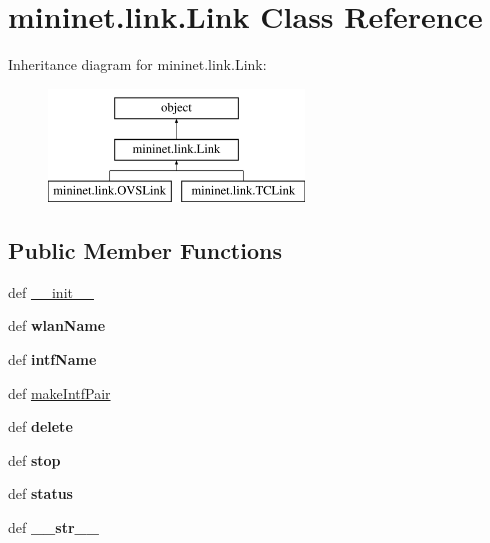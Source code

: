 \hypertarget{classmininet_1_1link_1_1Link}{\section{mininet.\-link.\-Link Class Reference}
\label{classmininet_1_1link_1_1Link}
}
Inheritance diagram for mininet.\-link.\-Link\-:\begin{figure}[H]
\begin{center}
\leavevmode
\includegraphics[height=3.000000cm]{classmininet_1_1link_1_1Link}
\end{center}
\end{figure}
\subsection*{Public Member Functions}
\begin{DoxyCompactItemize}
\item 
def \hyperlink{classmininet_1_1link_1_1Link_a05be53888b4da5ffc058c778659296f5}{\-\_\-\-\_\-init\-\_\-\-\_\-}
\item 
\hypertarget{classmininet_1_1link_1_1Link_a7cff25664aad51edfbfa64edfcd832dc}{def {\bfseries wlan\-Name}}\label{classmininet_1_1link_1_1Link_a7cff25664aad51edfbfa64edfcd832dc}

\item 
\hypertarget{classmininet_1_1link_1_1Link_aa3ea9cb1099157f8b8be624a7f2a7bdb}{def {\bfseries intf\-Name}}\label{classmininet_1_1link_1_1Link_aa3ea9cb1099157f8b8be624a7f2a7bdb}

\item 
def \hyperlink{classmininet_1_1link_1_1Link_ade37d7cffeff73830bec0129ac754622}{make\-Intf\-Pair}
\item 
\hypertarget{classmininet_1_1link_1_1Link_a032701855bcb981ae33e5b584d1526cb}{def {\bfseries delete}}\label{classmininet_1_1link_1_1Link_a032701855bcb981ae33e5b584d1526cb}

\item 
\hypertarget{classmininet_1_1link_1_1Link_a00831e1fab1e76169a3af3854f6c2a37}{def {\bfseries stop}}\label{classmininet_1_1link_1_1Link_a00831e1fab1e76169a3af3854f6c2a37}

\item 
\hypertarget{classmininet_1_1link_1_1Link_abbb76b51164c3f279cabc4316e63df34}{def {\bfseries status}}\label{classmininet_1_1link_1_1Link_abbb76b51164c3f279cabc4316e63df34}

\item 
\hypertarget{classmininet_1_1link_1_1Link_ad07f0cb915d250ff63cc6d7dc2f8510b}{def {\bfseries \-\_\-\-\_\-str\-\_\-\-\_\-}}\label{classmininet_1_1link_1_1Link_ad07f0cb915d250ff63cc6d7dc2f8510b}

\end{DoxyCompactItemize}
